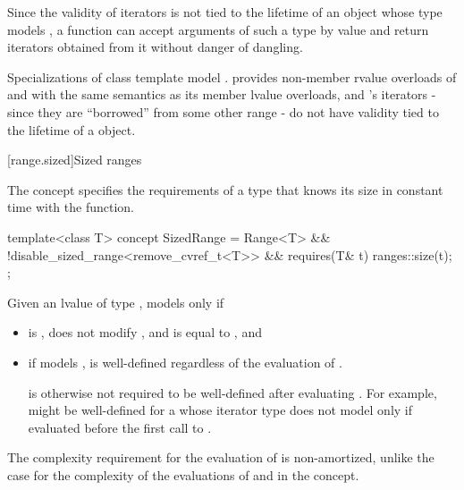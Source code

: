 \begin{itemdescr}
\pnum
\begin{note}
Since the validity of iterators is not tied to the lifetime of
an object whose type models ,
a function can accept arguments of such a type by value and
return iterators obtained from it without danger of dangling.
\end{note}

\pnum
\begin{example}
Specializations of class template 
model .  provides
non-member rvalue overloads of  and  with the same
semantics as its member lvalue overloads, and 's iterators
- since they are ``borrowed'' from some other range -
do not have validity tied to the lifetime of a  object.
\end{example}
\end{itemdescr}

[range.sized]{Sized ranges}

\pnum
The  concept specifies the requirements
of a  type that knows its size in constant time with the
 function.

%
\begin{itemdecl}
template<class T>
  concept SizedRange =
    Range<T> &&
    !disable_sized_range<remove_cvref_t<T>> &&
    requires(T& t) { ranges::size(t); };
\end{itemdecl}

\begin{itemdescr}
\pnum
Given an lvalue  of type , 
models  only if

\begin{itemize}
\item {} is , does not modify ,
and is equal to , and

\item if  models ,
 is well-defined regardless of the evaluation of
.
\begin{note}
 is otherwise not required to be
well-defined after evaluating .
For example,  might be well-defined
for a  whose iterator type
does not model 
only if evaluated before the first call to .
\end{note}
\end{itemize}

\pnum
\begin{note}
The complexity requirement for the evaluation of 
is non-amortized, unlike the case for the complexity of the evaluations of
 and  in the  concept.
\end{note}
\end{itemdescr}

